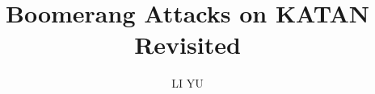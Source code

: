 \documentclass{usmthesis}
\author{LI YU}
\title{Boomerang Attacks on KATAN Revisited}
\begin{document}

\frontmatter
\frontmatter
\makecover




\begin{singlespace}
\tableofcontents \clearpage
\listoftables \clearpage
\listoffigures \clearpage



\end{singlespace}

\setlength\parskip{18pt}
\setlength\intextsep{24pt}

\begin{doublespace}



\mainmatter






\end{doublespace}
\titlespacing*{\chapter}{0pt}{25mm}{\baselineskip}
\begin{singlespace}

\end{singlespace}

\end{document}
